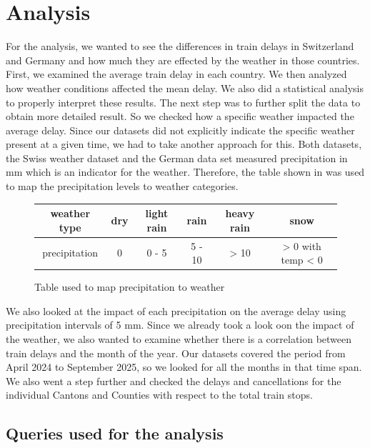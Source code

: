 \setlength{\parindent}{0pt}

\section{Analysis}
For the analysis, we wanted to see the differences in train delays in Switzerland and Germany
and how much they are effected by the weather in those countries.
First, we examined the average train delay in each country.
We then analyzed how weather conditions affected the mean delay.
We also did a statistical analysis to properly interpret these results.
The next step was to further split the data to obtain more detailed result.
So we checked how a specific weather impacted the average delay.
Since our datasets did not explicitly indicate the specific weather present at a given time, we had to take another approach for this.
Both datasets, the Swiss weather dataset and the German data set measured precipitation in mm which is an indicator for the weather.
Therefore, the table shown in  was used to map the precipitation levels to weather categories.
\begin{figure}[!ht]
    \centering
    \begin{tabular}{|c|c|c|c|c|c|}
        \hline
        weather type & dry & light rain & rain & heavy rain & snow \\
        \hline
        precipitation & 0 & 0 - 5 & 5 - 10 & > 10 & > 0 with temp < 0\\
        \hline
    \end{tabular}
    \caption{Table used to map precipitation to weather}
    \label{fig:g5_prec_to_weather}
\end{figure}
We also looked at the impact of each precipitation on the average delay using precipitation intervals of 5 mm.
Since we already took a look oon the impact of the weather, we also wanted to examine whether there is a correlation
between train delays and the month of the year.
Our datasets covered the period from April 2024 to September 2025,
so we looked for all the months in that time span.
We also went a step further and checked the delays and cancellations for the individual Cantons and Counties
with respect to the total train stops.

\subsection*{Queries used for the analysis}

